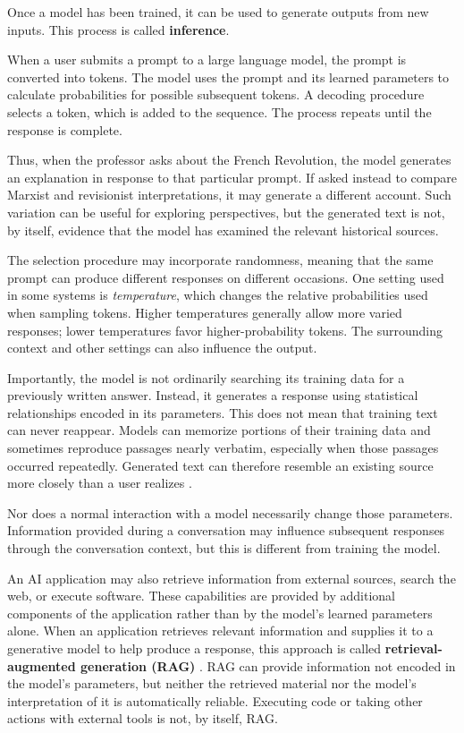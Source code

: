 \documentclass[11pt]{article}
\begin{document}
Once a model has been trained, it can be used to generate
outputs from new inputs. This process is called
\textbf{inference}.

When a user submits a prompt to a large language model,
the prompt is converted into tokens. The model uses the
prompt and its learned parameters to calculate probabilities
for possible subsequent tokens. A decoding procedure
selects a token, which is added to the sequence. The
process repeats until the response is complete.

Thus, when the professor asks about the French Revolution,
the model generates an explanation in response to that
particular prompt. If asked instead to compare Marxist and
revisionist interpretations, it may generate a different
account. Such variation can be useful for exploring
perspectives, but the generated text is not, by itself,
evidence that the model has examined the relevant historical
sources.

The selection procedure may incorporate randomness,
meaning that the same prompt can produce different
responses on different occasions. One setting used in some
systems is \emph{temperature}, which changes the relative
probabilities used when sampling tokens. Higher temperatures
generally allow more varied responses; lower temperatures
favor higher-probability tokens. The surrounding context and
other settings can also influence the output.

Importantly, the model is not ordinarily searching its
training data for a previously written answer. Instead,
it generates a response using statistical relationships
encoded in its parameters. This does not mean that training
text can never reappear. Models can memorize portions of their
training data and sometimes reproduce passages nearly verbatim,
especially when those passages occurred repeatedly. Generated
text can therefore resemble an existing source more closely
than a user realizes \citep{Carlini2023Memorization}.

Nor does a normal interaction with a model necessarily
change those parameters. Information provided during a
conversation may influence subsequent responses through
the conversation context, but this is different from
training the model.

An AI application may also retrieve information from
external sources, search the web, or execute software.
These capabilities are provided by additional components
of the application rather than by the model's learned
parameters alone. When an application retrieves relevant
information and supplies it to a generative model to help
produce a response, this approach is called
\textbf{retrieval-augmented generation (RAG)}
\citep{Lewis2020RAG}. RAG can provide information not encoded
in the model's parameters, but neither the retrieved material
nor the model's interpretation of it is automatically reliable.
Executing code or taking other actions with external tools
is not, by itself, RAG.
\end{document}
